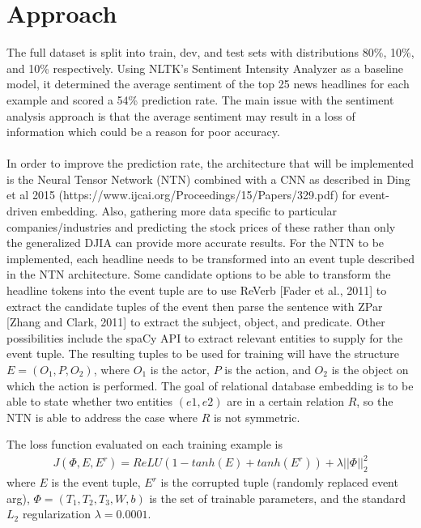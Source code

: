 \documentclass{article} %
\begin{document}
\section{Approach}

The full dataset is split into train, dev, and test sets with distributions 80\%, 10\%, and 10\% respectively.
Using NLTK's Sentiment Intensity Analyzer as a baseline model, it determined the average sentiment of the top 25 news headlines for each example and scored a 54\% prediction rate. 
The main issue with the sentiment analysis approach is that the average sentiment may result in a loss of information which could be a reason for poor accuracy.
\\ \\
In order to improve the prediction rate, the architecture that will be implemented is the Neural Tensor Network (NTN) combined with a CNN as described in Ding et al 2015 (https://www.ijcai.org/Proceedings/15/Papers/329.pdf) for event-driven embedding.
Also, gathering more data specific to particular companies/industries and predicting the stock prices of these rather than only the generalized DJIA can provide more accurate results.
For the NTN to be implemented, each headline needs to be transformed into an event tuple described in the NTN architecture.
Some candidate options to be able to transform the headline tokens into the event tuple are to use ReVerb [Fader et al., 2011]
to extract the candidate tuples of the event then parse the sentence with ZPar [Zhang and Clark, 2011] to
extract the subject, object, and predicate.
Other possibilities include the spaCy API to extract relevant entities to supply for the event tuple.
The resulting tuples to be used for training will have the structure $E=(O_1, P, O_2)$, where $O_1$ is the actor,
$P$ is the action, and $O_2$ is the object on which the action is performed.
The goal of relational database embedding is to be able to state whether two entities $(e1, e2)$ are in a certain relation $R$,
so the NTN is able to address the case where $R$ is not symmetric.

The loss function evaluated on each training example is
\begin{align}
  J(\Phi, E, E^r) = ReLU(1 - tanh(E) + tanh(E^r)) + \lambda||\Phi||^2_2
\end{align}
where $E$ is the event tuple, $E^r$ is the corrupted tuple (randomly replaced event arg), $\Phi = (T_1, T_2, T_3, W, b)$
is the set of trainable parameters, and the standard $L_2$ regularization $\lambda = 0.0001$.
\end{document}
